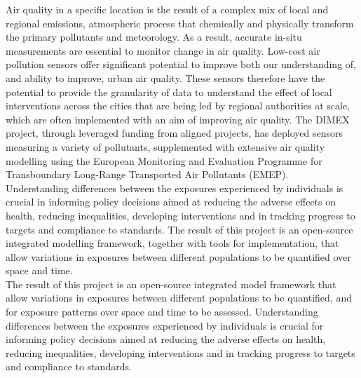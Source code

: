 \documentclass{article}
\begin{document}
\noindent  Air quality in a specific location is the result of a complex mix of local and regional emissions, atmospheric process that chemically and physically transform the primary pollutants and meteorology. As a result, accurate in-situ measurements are essential to monitor change in air quality. Low-cost air pollution sensors offer significant potential to improve both our understanding of, and ability to improve, urban air quality. These sensors therefore have the potential to provide the granularity of data to understand the effect of local interventions across the cities that are being led by regional authorities at scale, which are often implemented with an aim of improving air quality. The DIMEX project, through leveraged funding from aligned projects, has deployed sensors measuring a variety of pollutants, supplemented with extensive air quality modelling using the European Monitoring and Evaluation Programme for Transboundary Long-Range Transported Air Pollutants (EMEP).\\

\noindent Understanding differences between the exposures experienced by individuals is crucial in informing policy decisions aimed at reducing the adverse effects on health, reducing inequalities, developing interventions and in tracking progress to targets and compliance to standards. The result of this project is an open-source integrated modelling framework, together with tools for implementation, that allow variations in exposures between different populations to be quantified over space and time. \\


\noindent The result of this project is an open-source integrated model framework that allow variations in exposures between different populations to be quantified, and for exposure patterns over space and time to be assessed. Understanding differences between the exposures experienced by individuals is crucial for informing policy decisions aimed at reducing the adverse effects on health, reducing inequalities, developing interventions and in tracking progress to targets and compliance to standards. \\
\end{document}
